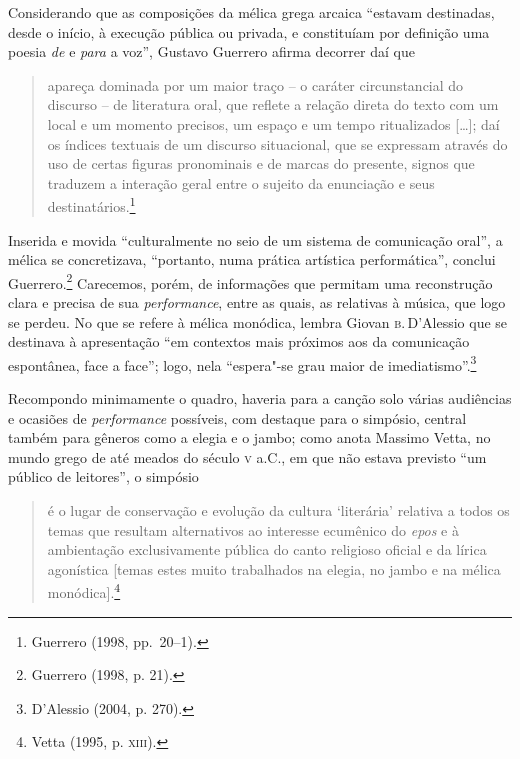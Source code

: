 Considerando que as composições da mélica grega arcaica “estavam destinadas,
desde o início, à execução pública ou privada, e constituíam por definição uma
poesia \textit{de} e \textit{para} a voz”, Gustavo Guerrero
afirma decorrer daí que

\begin{quote}
apareça dominada por um maior traço -- o caráter circunstancial do discurso -- de
literatura oral, que reflete a relação direta do texto com um local e um
momento precisos, um espaço e um tempo ritualizados [\ldots{}]; daí os índices
textuais de um discurso situacional, que se expressam através do uso de certas
figuras pronominais e de marcas do presente, signos que traduzem a interação
geral entre o sujeito da enunciação e seus destinatários.\footnote{ Guerrero (1998, pp.~20--1).}
\end{quote}

Inserida e movida “culturalmente no seio de um sistema de comunicação oral”, a
mélica se concretizava, “portanto, numa prática artística performática”,
conclui Guerrero.\footnote{ Guerrero (1998, p. 21).} Carecemos, porém, de informações que permitam uma
reconstrução clara e precisa de sua \textit{performance}, entre as quais, as
relativas à música, que logo se perdeu. No que se refere à mélica monódica,
lembra Giovan \textsc{b}.\,D’Alessio que se destinava à apresentação “em
contextos mais próximos aos da comunicação espontânea, face a face”; logo, nela
“espera"-se grau maior de imediatismo”.\footnote{ D’Alessio (2004, p. 270).} 

Recompondo minimamente o quadro, haveria para a canção solo várias audiências e
ocasiões de \textit{performance} possíveis, com destaque para o simpósio,
central também para gêneros como a elegia e o jambo; como anota Massimo Vetta,
no mundo grego de até meados do século \textsc{v} a.C., em que não
estava previsto “um público de leitores”, o simpósio 

\begin{quote}
é o lugar de conservação
e evolução da cultura ‘literária’ relativa a todos os temas que resultam
alternativos ao interesse ecumênico do \textit{epos} e à ambientação
exclusivamente pública do canto religioso oficial e da lírica agonística
[temas estes muito trabalhados na elegia, no jambo e na mélica monódica].\footnote{ Vetta (1995, p. \textsc{xiii}).}
\end{quote}

